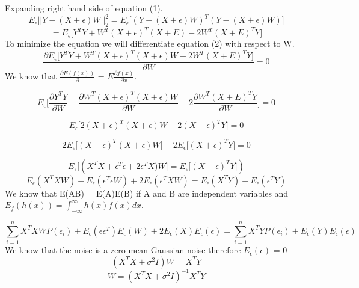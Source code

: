 \documentclass{article}
\begin{document}
Expanding right hand side of equation (1).
\begin{equation*}
 E_\epsilon || Y - (X+\epsilon)W||_2^2  = E_\epsilon \bigg[(Y - (X+\epsilon)W)^T(Y - (X+\epsilon)W)\bigg]
\end{equation*}
\begin{equation*}
= E_\epsilon \bigg[ Y^TY + W^T(X+\epsilon)^T(X+E) - 2W^T(X+E)^TY \bigg] \tag{2}
\end{equation*}
To minimize the equation we will differentiate equation (2) with respect to W.
\begin{equation*}
	\frac{\partial E_\epsilon \bigg[ Y^TY + W^T(X+\epsilon)^T(X+\epsilon)W - 2W^T(X+E)^TY \bigg]}{\partial W} = 0
\end{equation*}
We know that $\frac{\partial E(f(x))}{\partial}$  = $E\frac{\partial f(x)}{\partial x}$.

\begin{equation*}
	E_\epsilon \bigg[ \frac{\partial Y^TY}{\partial W } + \frac{\partial W^T(X+\epsilon)^T(X+\epsilon)W}{\partial W} -  2\frac{\partial W^T(X+E)^TY}{\partial W}\bigg] = 0
\end{equation*}

\begin{equation*}
	E_\epsilon\big[ 2(X+\epsilon)^T(X+\epsilon)W -2(X+\epsilon)^TY\big] = 0
\end{equation*}

\begin{equation*}
	2E_\epsilon \big[(X+\epsilon)^T(X+\epsilon)W \big] -2 E_\epsilon \big[(X+\epsilon)^TY\big] = 0
\end{equation*}

\begin{equation*}
	E_\epsilon\big[(X^TX+\epsilon^T\epsilon +2\epsilon^TX\big)W] = E_\epsilon\big[(X+\epsilon)^TY\big])
\end{equation*}
\begin{equation*}
	E_\epsilon(X^TXW)+ E_\epsilon(\epsilon^T\epsilon W) + 2E_\epsilon(\epsilon^TX W) = E_\epsilon(X^TY) + E_\epsilon(\epsilon^TY)
\end{equation*}
We know that E(AB) = E(A)E(B) if A and B are independent variables and $E_f(h(x)) = \int_{-\infty}^{\infty}h(x)f(x)dx$.

\begin{equation*}
	\sum_{i=1}^{n}X^TXWP(\epsilon_i) + E_\epsilon(\epsilon\epsilon^T)E_\epsilon(W) +2E_\epsilon(X)E_\epsilon(\epsilon)  = \sum_{i=1}^{n} X^TYP(\epsilon_i) + E_\epsilon(Y)E_\epsilon(\epsilon)
\end{equation*}
We know that the noise is a zero mean Gaussian noise therefore $E_\epsilon(\epsilon)$ = 0
\begin{equation*}
	(X^TX + \sigma^2I)W = X^TY
\end{equation*}
\begin{equation*}
	W = (X^TX + \sigma^2I)^{-1}X^TY
\end{equation*}
\end{document}
